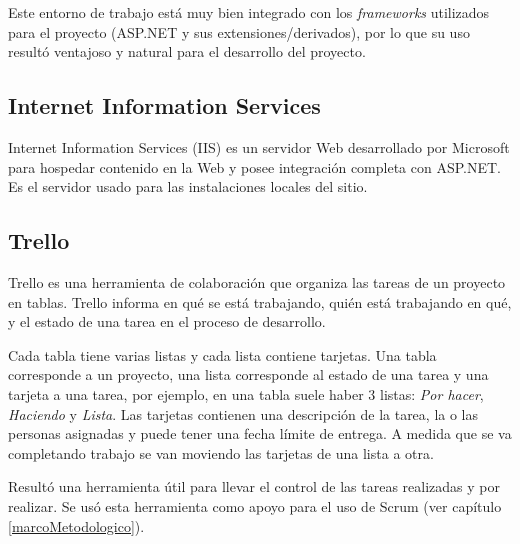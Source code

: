 Este entorno de trabajo está muy bien integrado con los \textit{frameworks} utilizados para el proyecto (ASP.NET y sus extensiones/derivados), por lo que su uso resultó ventajoso y natural para el desarrollo del proyecto.

\subsection{Internet Information Services}
Internet Information Services (IIS) es un servidor Web desarrollado por Microsoft para hospedar contenido en la Web \cite{IISMicrosoft} y posee integración completa con ASP.NET. Es el servidor usado para las instalaciones locales del sitio.

\subsection{Trello}
Trello es una herramienta de colaboración que organiza las tareas de un proyecto en tablas. Trello informa en qué se está trabajando, quién está trabajando en qué, y el estado de una tarea en el proceso de desarrollo.

Cada tabla tiene varias listas y cada lista contiene tarjetas. Una tabla corresponde a un proyecto, una lista corresponde al estado de una tarea y una tarjeta a una tarea, por ejemplo, en una tabla suele haber 3 listas: \emph{Por hacer}, \emph{Haciendo} y \emph{Lista}. Las tarjetas contienen una descripción de la tarea, la o las personas asignadas y puede tener una fecha límite de entrega. A medida que se va completando trabajo se van moviendo las tarjetas de una lista a otra.

Resultó una herramienta útil para llevar el control de las tareas realizadas y por realizar. Se usó esta herramienta como apoyo para el uso de Scrum (ver capítulo \ref{marcoMetodologico}).